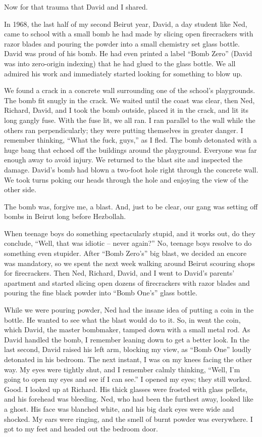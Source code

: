 Now for that trauma that David and I shared.

In 1968, the last half of my second Beirut year, David, a day student
like Ned, came to school with a small bomb he had made by slicing open
firecrackers with razor blades and pouring the powder into a small
chemistry set glass bottle. David was proud of his bomb. He had even
printed a label ``Bomb Zero'' (David was into zero-origin indexing) that
he had glued to the glass bottle. We all admired his work and
immediately started looking for something to blow up.

We found a crack in a concrete wall surrounding one of the school's
playgrounds. The bomb fit snugly in the crack. We waited until the coast
was clear, then Ned, Richard, David, and I took the bomb outside, placed
it in the crack, and lit its long gangly fuse. With the fuse lit, we all
ran. I ran parallel to the wall while the others ran perpendicularly;
they were putting themselves in greater danger. I remember thinking,
``What the fuck, guys,'' as I fled. The bomb detonated with a huge bang
that echoed off the buildings around the playground. Everyone was far
enough away to avoid injury. We returned to the blast site and inspected
the damage. David's bomb had blown a two-foot hole right through the
concrete wall. We took turns poking our heads through the hole and
enjoying the view of the other side.

The bomb was, forgive me, a blast. And, just to be clear, our gang was
setting off bombs in Beirut long before Hezbollah.

When teenage boys do something spectacularly stupid, and it works out,
do they conclude, ``Well, that was idiotic -- never again?'' No, teenage
boys resolve to do something even stupider. After ``Bomb Zero's'' big
blast, we decided an encore was mandatory, so we spent the next week
walking around Beirut scouring shops for firecrackers. Then Ned,
Richard, David, and I went to David's parents' apartment and started
slicing open dozens of firecrackers with razor blades and pouring the
fine black powder into ``Bomb One's'' glass bottle.

While we were pouring powder, Ned had the insane idea of putting a coin
in the bottle. He wanted to see what the blast would do to it. So, in
went the coin, which David, the master bombmaker, tamped down with a
small metal rod. As David handled the bomb, I remember leaning down to
get a better look. In the last second, David raised his left arm,
blocking my view, as ``Bomb One'' loudly detonated in his bedroom. The
next instant, I was on my knees facing the other way. My eyes were
tightly shut, and I remember calmly thinking, ``Well, I'm going to open
my eyes and see if I can see.'' I opened my eyes; they still worked.
Good. I looked up at Richard. His thick glasses were frosted with glass
pellets, and his forehead was bleeding. Ned, who had been the furthest
away, looked like a ghost. His face was blanched white, and his big dark
eyes were wide and shocked. My ears were ringing, and the smell of burnt
powder was everywhere. I got to my feet and headed out the bedroom door.

